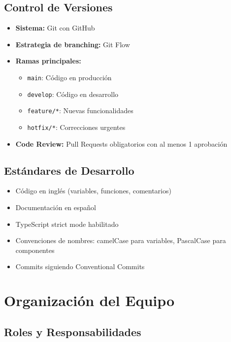 \subsection{Control de Versiones}
\begin{itemize}
    \item \textbf{Sistema:} Git con GitHub
    \item \textbf{Estrategia de branching:} Git Flow
    \item \textbf{Ramas principales:}
    \begin{itemize}
        \item \texttt{main}: Código en producción
        \item \texttt{develop}: Código en desarrollo
        \item \texttt{feature/*}: Nuevas funcionalidades
        \item \texttt{hotfix/*}: Correcciones urgentes
    \end{itemize}
    \item \textbf{Code Review:} Pull Requests obligatorios con al menos 1 aprobación
\end{itemize}

\subsection{Estándares de Desarrollo}
\begin{itemize}
    \item Código en inglés (variables, funciones, comentarios)
    \item Documentación en español
    \item TypeScript strict mode habilitado
    \item Convenciones de nombres: camelCase para variables, PascalCase para componentes
    \item Commits siguiendo Conventional Commits
\end{itemize}

\section{Organización del Equipo}

\subsection{Roles y Responsabilidades}

